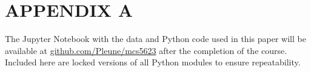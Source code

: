 \documentclass[conference]{IEEEtran}
\begin{document}
\section*{APPENDIX A}

The Jupyter Notebook with the data and Python code used in this paper will be
available at
\href{https://github.com/Pleune/mcs5623/}{github.com/Pleune/mcs5623} after the
completion of the course. Included here are locked versions of all Python
modules to ensure repeatability.

\printbibliography
\end{document}

